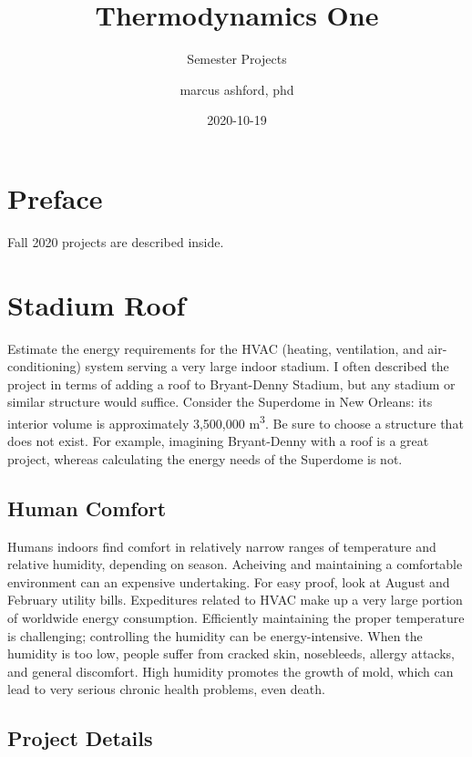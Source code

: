 \documentclass[
]{book}
\title{Thermodynamics One}
\subtitle{Semester Projects}
\author{marcus ashford, phd}
\date{2020-10-19}
\begin{document}
\maketitle

{
\setcounter{tocdepth}{1}
\tableofcontents
}
\hypertarget{preface}{%
\chapter*{Preface}\label{preface}}

Fall 2020 projects are described inside.

\hypertarget{stadium-roof}{%
\chapter{Stadium Roof}\label{stadium-roof}}

Estimate the energy requirements for the HVAC (heating, ventilation, and air-conditioning) system serving a very large indoor stadium. I often described the project in terms of adding a roof to Bryant-Denny Stadium, but any stadium or similar structure would suffice. Consider the Superdome in New Orleans: its interior volume is approximately 3,500,000 m\textsuperscript{3}. Be sure to choose a structure that does not exist. For example, imagining Bryant-Denny with a roof is a great project, whereas calculating the energy needs of the Superdome is not.

\hypertarget{human-comfort}{%
\section{Human Comfort}\label{human-comfort}}

Humans indoors find comfort in relatively narrow ranges of temperature and relative humidity, depending on season. Acheiving and maintaining a comfortable environment can an expensive undertaking. For easy proof, look at August and February utility bills. Expeditures related to HVAC make up a very large portion of worldwide energy consumption. Efficiently maintaining the proper temperature is challenging; controlling the humidity can be energy-intensive. When the humidity is too low, people suffer from cracked skin, nosebleeds, allergy attacks, and general discomfort. High humidity promotes the growth of mold, which can lead to very serious chronic health problems, even death.

\hypertarget{project-details}{%
\section{Project Details}\label{project-details}}
\end{document}
